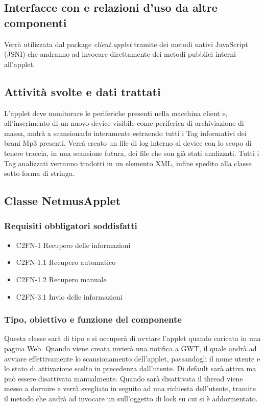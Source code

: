 \subsection*{Interfacce con e relazioni d'uso da altre componenti}
Verr\`a utilizzata dal package \emph{client.applet} tramite dei metodi nativi
JavaScript (JSNI) che andranno ad invocare direttamente dei metodi pubblici
interni  all'applet.

\subsection*{Attivit\`a svolte e dati trattati}
L'applet deve monitorare le periferiche presenti nella macchina client e,
all'inserimento di un nuovo device visibile come periferica di archiviazione di
massa, andr\`a a scansionarlo interamente estraendo tutti i Tag informativi dei
brani Mp3 presenti. Verr\`a creato un file di log interno al device con lo scopo
di tenere traccia, in una scansione futura, dei file che son gi\`a stati
analizzati. Tutti i Tag analizzati verranno tradotti in un elemento XML, infine
spedito alla classe  sotto forma di stringa.\\


\subsection{Classe NetmusApplet}
\subsubsection*{Requisiti obbligatori soddisfatti}
\begin{itemize}
   \item C2FN-1 Recupero delle informazioni
   \item C2FN-1.1 Recupero automatico
   \item C2FN-1.2 Recupero manuale
   \item C2FN-3.1 Invio delle informazioni
\end{itemize}

\subsubsection*{Tipo, obiettivo e funzione del componente}
Questa classe sar\`a di tipo  e si occuper\`a di avviare l'applet
quando caricata in una pagina Web. Quando viene creata invier\`a una notifica a
GWT, il quale andr\`a ad avviare effettivamente lo scansionamento dell'applet,
passandogli il nome utente e lo stato di attivazione scelto in precedenza
dall'utente. Di default sar\`a attiva ma pu\`o essere disattivata manualmente.
Quando sar\`a disattivata il thread  viene messo a dormire e verr\`a
svegliato in seguito ad una richiesta dell'utente, tramite il metodo
 che andr\`a ad invocare un  sull'oggetto di lock su
cui  si \`e addormentato.

